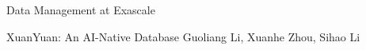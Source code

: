 \documentclass[11pt]{article}
\begin{document}
\begin{bulletin}
\begin{articlesection}{Data Management at Exascale}
\begin{article}
{XuanYuan: An AI-Native Database}
{Guoliang Li, Xuanhe Zhou, Sihao Li}
\graphicspath{{submissions/ainative/}}

\end{article}



\end{articlesection}




%
%





\begin{callsection}


\end{callsection}
\end{bulletin}
\end{document}
